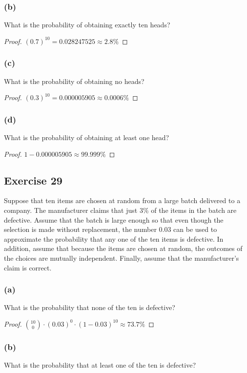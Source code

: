 \documentclass[14pt]{extarticle}
\begin{document}
\subsubsection{(b)}
What is the probability of obtaining exactly ten heads?
\begin{proof}
\((0.7)^{10} = 0.028247525 \approx 2.8\%\)
\end{proof}

\subsubsection{(c)}
What is the probability of obtaining no heads?
\begin{proof}
\((0.3)^{10} = 0.000005905 \approx 0.0006\%\)
\end{proof}

\subsubsection{(d)}
What is the probability of obtaining at least one head?
\begin{proof}
\(1 - 0.000005905 \approx 99.999\%\)
\end{proof}

\subsection{Exercise 29}
Suppose that ten items are chosen at random from a large batch delivered to a company. The manufacturer claims that just 3\% 
of the items in the batch are defective. Assume that the batch is large enough so that even though the selection is made 
without replacement, the number 0.03 can be used to approximate the probability that any one of the ten items is 
defective. In addition, assume that because the items are chosen at random, the outcomes of the choices are mutually 
independent. Finally, assume that the manufacturer’s claim is correct.

\subsubsection{(a)}
What is the probability that none of the ten is defective?
\begin{proof}
\(\binom{10}{0} \cdot (0.03)^0 \cdot (1 - 0.03)^{10} \approx 73.7\%\)
\end{proof}

\subsubsection{(b)}
What is the probability that at least one of the ten is defective?
\end{document}
